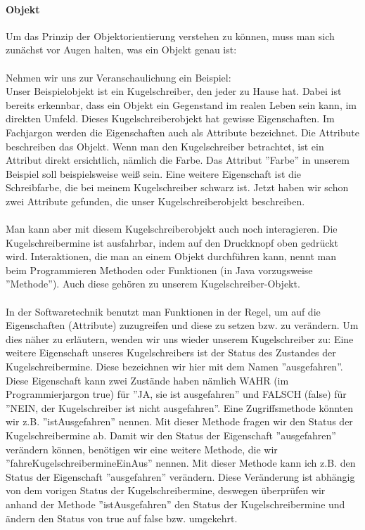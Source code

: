 \paragraph{Objekt}
Um das Prinzip der Objektorientierung verstehen zu können, muss man sich zunächst vor Augen halten, was ein Objekt genau ist:\\
\\
Nehmen wir uns zur Veranschaulichung ein Beispiel:\\
Unser Beispielobjekt ist ein Kugelschreiber, den jeder zu Hause hat. Dabei ist bereits erkennbar, dass ein Objekt ein Gegenstand im realen Leben sein kann, im direkten Umfeld. Dieses Kugelschreiberobjekt hat gewisse Eigenschaften. Im Fachjargon werden die Eigenschaften auch als Attribute bezeichnet. Die Attribute beschreiben das Objekt. Wenn man den Kugelschreiber betrachtet, ist ein Attribut direkt ersichtlich, nämlich die Farbe. Das Attribut ''Farbe'' in unserem Beispiel soll beispielsweise weiß sein. Eine weitere Eigenschaft ist die Schreibfarbe, die bei meinem Kugelschreiber schwarz ist. Jetzt haben wir schon zwei Attribute gefunden, die unser Kugelschreiberobjekt beschreiben.\\
\\
Man kann aber mit diesem Kugelschreiberobjekt auch noch interagieren. Die Kugelschreibermine ist ausfahrbar, indem auf den Druckknopf oben gedrückt wird. Interaktionen, die man an einem Objekt durchführen kann, nennt man beim Programmieren Methoden oder Funktionen (in Java vorzugsweise ''Methode''). Auch diese gehören zu unserem Kugelschreiber-Objekt.\\
\\
In der Softwaretechnik benutzt man Funktionen in der Regel, um auf die Eigenschaften (Attribute) zuzugreifen und  diese zu setzen bzw. zu verändern. Um dies näher zu erläutern, wenden wir uns wieder unserem Kugelschreiber zu: Eine weitere Eigenschaft unseres Kugelschreibers ist der Status des Zustandes der Kugelschreibermine. Diese bezeichnen wir hier mit dem Namen ''ausgefahren''. Diese Eigenschaft kann zwei Zustände haben nämlich WAHR (im Programmierjargon true) für ''JA, sie ist ausgefahren'' und FALSCH (false) für ''NEIN, der Kugelschreiber ist nicht ausgefahren''. Eine Zugriffsmethode könnten wir z.B. ''istAusgefahren'' nennen. Mit dieser Methode fragen wir den Status der Kugelschreibermine ab. Damit wir den Status der Eigenschaft ''ausgefahren'' verändern können, benötigen wir eine weitere Methode, die wir ''fahreKugelschreibermineEinAus'' nennen. Mit dieser Methode kann ich z.B. den Status der Eigenschaft ''ausgefahren'' verändern. Diese Veränderung ist abhängig von dem vorigen Status der Kugelschreibermine, deswegen überprüfen wir anhand der Methode ''istAusgefahren'' den Status der Kugelschreibermine und ändern den Status von true auf false bzw. umgekehrt.\\
